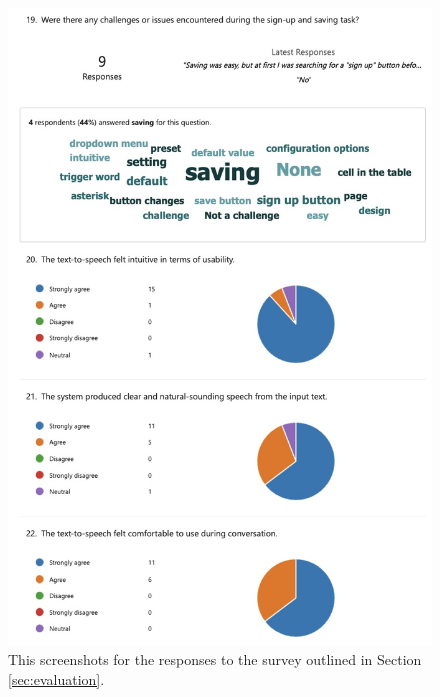 \documentclass{l4proj}
\begin{document}
\begin{appendices}
\begin{figure}[H]
    \centering
    \includegraphics[width=0.75\linewidth]{dissertation/images/eval-5.jpeg}    
    \caption{This screenshots for the responses to the survey outlined in Section \ref{sec:evaluation}.}
    \label{fig:eval-survey-5} 
\end{figure}


\end{appendices}
\end{document}
